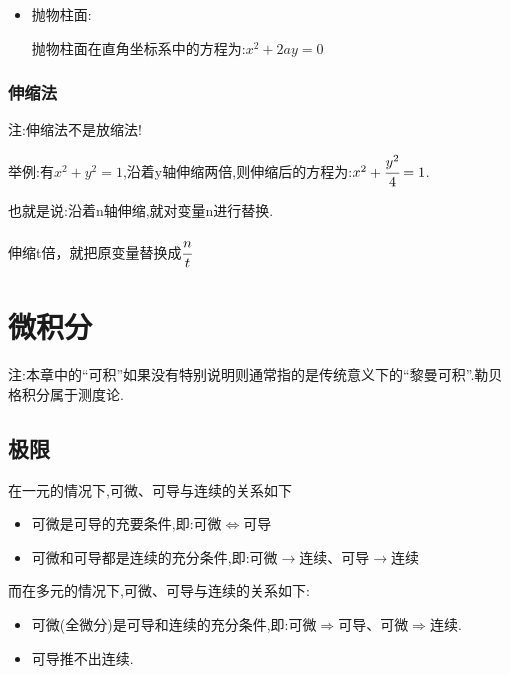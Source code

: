 \documentclass[UTF8,12pt]{ctexbook}
\begin{document}
{{{{\begin{itemize}
{\begin{itemize}
{                      双曲柱面在直角坐标系中的方程为:$\cfrac{x^2}{a^2} - \cfrac{y^2}{b^2} = 1$
                      }
                \item {
                      抛物柱面:

                      抛物柱面在直角坐标系中的方程为:$x^2 + 2ay = 0$
                      }
              \end{itemize}
              }
      \end{itemize}
    }%

    \subsubsection{伸缩法}{
      注:伸缩法不是放缩法!

      举例:有$x^2 + y^2 = 1$,沿着y轴伸缩两倍,则伸缩后的方程为:$x^2 + \cfrac{y^2}{4} = 1$.

      也就是说:沿着n轴伸缩,就对变量n进行替换.

      伸缩t倍，就把原变量替换成$\cfrac{n}{t}$
    }%
  }%

 }%

\section{微积分}{
注:本章中的“可积”如果没有特别说明则通常指的是传统意义下的“黎曼可积”.勒贝格积分属于测度论.

\subsection{极限}{

  在一元的情况下,可微、可导与连续的关系如下

  \begin{itemize}
    \item 可微是可导的充要条件,即:可微$\Leftrightarrow$可导
    \item 可微和可导都是连续的充分条件,即:可微$\rightarrow$连续、可导$\rightarrow$连续
  \end{itemize}

  而在多元的情况下,可微、可导与连续的关系如下:

  \begin{itemize}
    \item 可微(全微分)是可导和连续的充分条件,即:可微$\Rightarrow$可导、可微$\Rightarrow$连续.
    \item 可导推不出连续.
  \end{itemize}

}}}
\end{document}
